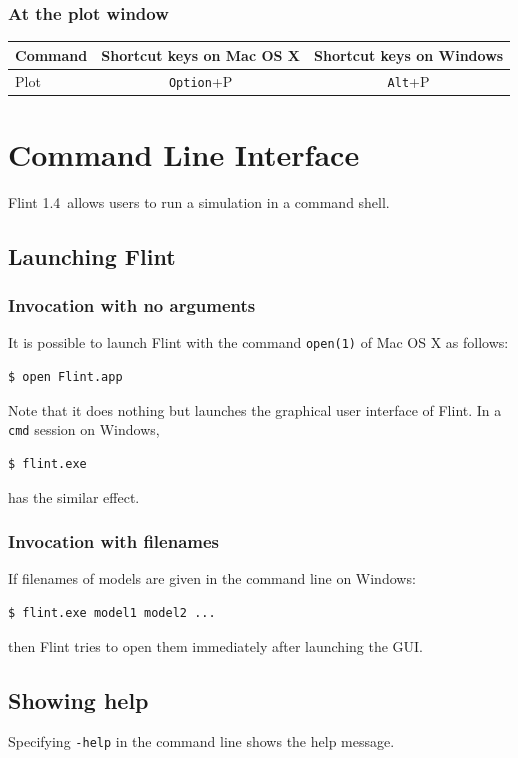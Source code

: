 \documentclass[a4paper,10pt]{report}
\def\FlintVersion{1.4}
\def\Flint{Flint \FlintVersion}
\begin{document}
\subsection{At the plot window}
\begin{tabular}{l||c|c}
  Command & Shortcut keys on Mac OS X & Shortcut keys on Windows \\
  \hline
  Plot & {\tt Option}+P & {\tt Alt}+P \\
\end{tabular}



\chapter{Command Line Interface}
\Flint\ allows users to run a simulation in a command shell.

\section{Launching Flint}

\subsection{Invocation with no arguments}
It is possible to launch Flint with the command {\tt open(1)} of Mac OS X as follows:
\begin{verbatim}
$ open Flint.app
\end{verbatim}
Note that it does nothing but launches the graphical user interface of Flint.
In a {\tt cmd} session on Windows,
\begin{verbatim}
$ flint.exe
\end{verbatim}
has the similar effect.

\subsection{Invocation with filenames}
If filenames of models are given in the command line on Windows:
\begin{verbatim}
$ flint.exe model1 model2 ...
\end{verbatim}
then Flint tries to open them immediately after launching the GUI.

\section{Showing help}
Specifying {\tt -help} in the command line shows the help message.
\end{document}
